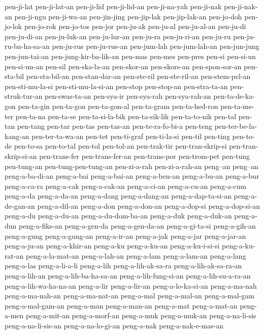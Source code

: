 {pen-ji-lat pen-ji-lat-an pen-ji-lid pen-ji-lid-an pen-ji-na-yah pen-ji-nak
pen-ji-nak-an pen-ji-ngu pen-ji-wa-an pen-jin-jing pen-jip-lak
pen-jip-lak-an pen-jo-doh pen-jo-lok pen-jo-rok pen-jo-tos pen-jor
pen-ju-ak pen-ju-al pen-ju-al-an pen-ju-di pen-ju-di-an pen-ju-luk-an
pen-ju-lur-an pen-ju-ra pen-ju-ri-an pen-ju-ru pen-ju-ru-ba-ha-sa-an
pen-ju-rus pen-ju-rus-an pen-jum-lah pen-jum-lah-an pen-jun-jung
pen-jun-tai-an pen-jung-kir-ba-lik-an pen-mas pen-mes pen-pres pen-si
pen-si-un pen-si-un-an pen-sil pen-ska-la-an pen-skor-an pen-skors-an
pen-spon-sor-an pen-sta-bil pen-sta-bil-an pen-stan-dar-an pen-ste-ril
pen-ste-ril-an pen-stem-pel-an pen-sti-mu-la-si pen-sti-mu-la-si-an
pen-stop pen-stop-an pen-stra-ta-an pen-struk-tur-an pen-swas-ta-an
pen-sya-ir pen-sya-rah pen-sya-rah-an pen-ta-de-ka-gon pen-ta-gin
pen-ta-gon pen-ta-gon-al pen-ta-gram pen-ta-hed-ron pen-ta-me-ter
pen-ta-na pen-ta-se pen-ta-si-la-bik pen-ta-sik-lik pen-ta-to-nik pen-tal
pen-tan pen-tang pen-tar pen-tas pen-tas-an pen-te-ra-fo-bi-a pen-teng
pen-ter-be-la-kang-an pen-ter-ta-wa-an pen-tet pen-ti-graf pen-ti-la-si
pen-til pen-ting pen-to-de pen-to-sa pen-to-tal pen-tol pen-tol-an
pen-trak-tir pen-tran-skrip-si pen-tran-skrip-si-an pen-trans-fer
pen-trans-fer-an pen-trans-por pen-trom-pet pen-tung pen-tung-an
pen-tung-pen-tung-an pen-zi-a-rah pen-zi-a-rah-an peng--an peng--an
peng-a-ba-di-an peng-a-bai peng-a-bai-an peng-a-ben-an peng-a-bu-an
peng-a-bur peng-a-ca-ra peng-a-cak peng-a-cak-an peng-a-ci-an peng-a-cu-an
peng-a-cum peng-a-da peng-a-da-an peng-a-dang peng-a-dang-an
peng-a-dap-ta-si-an peng-a-de-gan-an peng-a-dil-an peng-a-don
peng-a-don-an peng-a-dop-si peng-a-dop-si-an peng-a-du peng-a-du-an
peng-a-du-dom-ba-an peng-a-duk peng-a-duk-an peng-a-dun peng-a-fiks-an
peng-a-gen-da peng-a-gen-da-an peng-a-gi-ta-si peng-a-gih-an peng-a-gung
peng-a-gung-an peng-a-ir-an peng-a-jak peng-a-jar peng-a-jar-an
peng-a-ju-an peng-a-khir-an peng-a-ku peng-a-ku-an peng-a-ku-i-si-si
peng-a-ku-rat-an peng-a-la-mat-an peng-a-lah-an peng-a-lam peng-a-lam-an
peng-a-lang peng-a-las peng-a-li-a-li peng-a-lih peng-a-lih-ak-sa-ra
peng-a-lih-ak-sa-ra-an peng-a-lih-an peng-a-lih-ba-ha-sa-an
peng-a-lih-fung-si-an peng-a-lih-su-a-ra-an peng-a-lih-wa-ha-na-an
peng-a-lir peng-a-lir-an peng-a-lo-ka-si-an peng-a-ma-nah peng-a-ma-nah-an
peng-a-ma-nat-an peng-a-mal peng-a-mal-an peng-a-mal-gam peng-a-mal-gam-an
peng-a-man peng-a-man-an peng-a-mat peng-a-mat-an peng-a-men peng-a-mit-an
peng-a-morf-an peng-a-muk peng-a-muk-an peng-a-na-li-sis
peng-a-na-li-sis-an peng-a-na-lo-gi-an peng-a-nak peng-a-nak-e-mas-an
}
